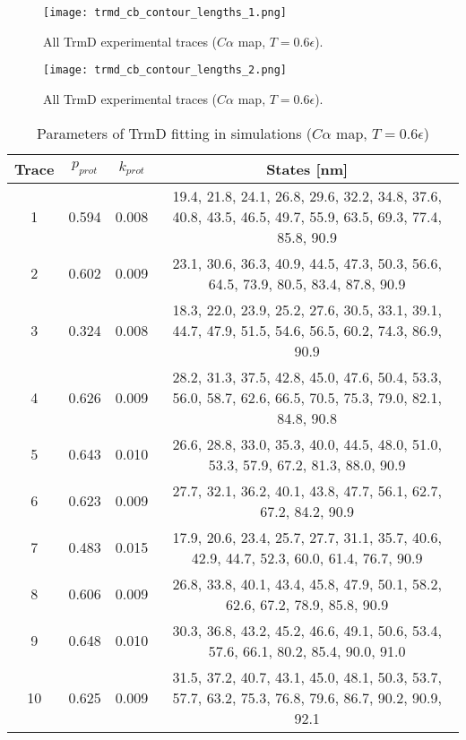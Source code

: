 \begin{figure}
    \centering
    \texttt{[image: trmd\_cb\_contour\_lengths\_1.png]}
    \caption{All TrmD experimental traces ($C\alpha$ map, $T=0.6\epsilon$).}
    \label{fig:trmd-cb-cl1}
\end{figure}

\begin{figure}
    \centering
    \texttt{[image: trmd\_cb\_contour\_lengths\_2.png]}
    \caption{All TrmD experimental traces ($C\alpha$ map, $T=0.6\epsilon$).}
    \label{fig:trmd-cb-cl2}
\end{figure}

\begin{table}
    \tiny
    \centering
    \caption{Parameters of TrmD fitting in simulations ($C\alpha$ map, $T=0.6\epsilon$)}
    \label{tab:trmd-cb-parameters}
    \begin{tabular}{c|c|c|c}
        \textbf{Trace} & \textbf{$p_{prot}$} & \textbf{$k_{prot}$} & \textbf{States [nm]}\\\hline
        1 & 0.594 & 0.008 & 19.4, 21.8, 24.1, 26.8, 29.6, 32.2, 34.8, 37.6, 40.8, 43.5, 46.5, 49.7, 55.9, 63.5, 69.3, 77.4, 85.8, 90.9\\
        2 & 0.602 & 0.009 & 23.1, 30.6, 36.3, 40.9, 44.5, 47.3, 50.3, 56.6, 64.5, 73.9, 80.5, 83.4, 87.8, 90.9\\
        3 & 0.324 & 0.008 & 18.3, 22.0, 23.9, 25.2, 27.6, 30.5, 33.1, 39.1, 44.7, 47.9, 51.5, 54.6, 56.5, 60.2, 74.3, 86.9, 90.9\\
        4 & 0.626 & 0.009 & 28.2, 31.3, 37.5, 42.8, 45.0, 47.6, 50.4, 53.3, 56.0, 58.7, 62.6, 66.5, 70.5, 75.3, 79.0, 82.1, 84.8, 90.8\\
        5 & 0.643 & 0.010 & 26.6, 28.8, 33.0, 35.3, 40.0, 44.5, 48.0, 51.0, 53.3, 57.9, 67.2, 81.3, 88.0, 90.9\\
        6 & 0.623 & 0.009 & 27.7, 32.1, 36.2, 40.1, 43.8, 47.7, 56.1, 62.7, 67.2, 84.2, 90.9\\
        7 & 0.483 & 0.015 & 17.9, 20.6, 23.4, 25.7, 27.7, 31.1, 35.7, 40.6, 42.9, 44.7, 52.3, 60.0, 61.4, 76.7, 90.9\\
        8 & 0.606 & 0.009 & 26.8, 33.8, 40.1, 43.4, 45.8, 47.9, 50.1, 58.2, 62.6, 67.2, 78.9, 85.8, 90.9\\
        9 & 0.648 & 0.010 & 30.3, 36.8, 43.2, 45.2, 46.6, 49.1, 50.6, 53.4, 57.6, 66.1, 80.2, 85.4, 90.0, 91.0\\
        10 & 0.625 & 0.009 & 31.5, 37.2, 40.7, 43.1, 45.0, 48.1, 50.3, 53.7, 57.7, 63.2, 75.3, 76.8, 79.6, 86.7, 90.2, 90.9, 92.1\\

\end{tabular}
\end{table}
